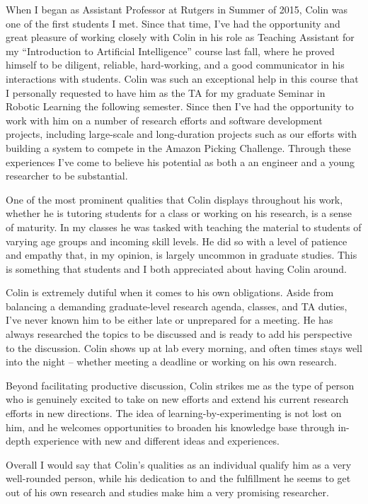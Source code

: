 \documentclass[11pt]{letter} %
\begin{document}
\begin{letter}{}
When I began as Assistant Professor at Rutgers in Summer of 2015, Colin was one of the first students I met.
Since that time, I've had the opportunity and great pleasure of working closely with Colin in his role as Teaching Assistant
for my ``Introduction to Artificial Intelligence'' course last fall, where he proved himself to be
diligent, reliable, hard-working, and a good communicator in his interactions with students. Colin was such 
an exceptional help in this course that I personally requested to have him as the TA for my graduate Seminar
in Robotic Learning the following semester. Since then I've had the opportunity to work with him on a number of
research efforts and software development projects, including large-scale and long-duration projects 
such as our efforts with building a system to compete in the Amazon Picking Challenge. Through these experiences
I've come to believe his potential as both a an engineer and a young researcher to be substantial. 

One of the most prominent qualities that Colin displays throughout his work, whether he is tutoring students 
for a class or working on his research, is a sense of maturity. In my classes he was tasked with teaching the 
material to students of varying age groups and incoming skill levels. He did so with a level of patience and 
empathy that, in my opinion, is largely uncommon in graduate studies. This is something that students and I 
both appreciated about having Colin around. 

Colin is extremely dutiful when it comes to his own obligations. Aside from balancing a demanding graduate-level 
research agenda, classes, and TA duties, I've never known him to be either late or unprepared for a meeting. 
He has always researched the topics to be discussed and is ready to add his perspective to the discussion. 
Colin shows up at lab every morning, and often times stays well into the night -- whether meeting a deadline 
or working on his own research.  

Beyond facilitating productive discussion, Colin strikes me as the type of person who is genuinely excited to 
take on new efforts and extend his current research efforts in new directions. The idea of learning-by-experimenting 
is not lost on him, and he welcomes opportunities to broaden his knowledge base through in-depth experience with 
new and different ideas and experiences.

Overall I would say that Colin's qualities as an individual qualify him as a very well-rounded person, while his 
dedication to and the fulfillment he seems to get out of his own research and studies make him a very promising 
researcher. 


\end{letter}
\end{document}
